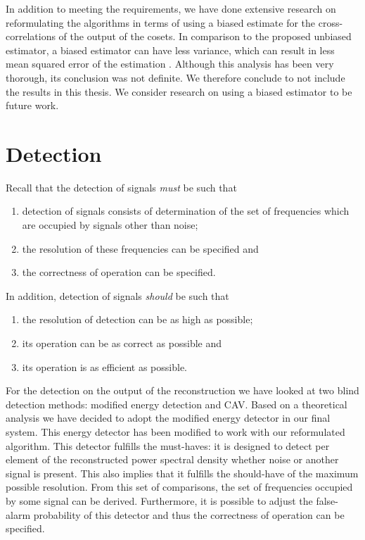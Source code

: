 \documentclass[a4paper, openany, oneside]{memoir}
\begin{document}
In addition to meeting the requirements, we have done extensive research on reformulating the algorithms in terms of using a biased estimate for the cross-correlations of the output of the cosets. In comparison to the proposed unbiased estimator, a biased estimator can have less variance, which can result in less mean squared error of the estimation \cite{hayes1996statistical}. Although this analysis has been very thorough, its conclusion was not definite. We therefore conclude to not include the results in this thesis. We consider research on using a biased estimator to be future work.

\section{Detection}
Recall that the detection of signals \emph{must} be such that
\begin{enumerate}
    \item detection of signals consists of determination of the set of frequencies which are occupied by signals other than noise;
    \item the resolution of these frequencies can be specified and
    \item the correctness of operation can be specified.
\end{enumerate}
In addition, detection of signals \emph{should} be such that
\begin{enumerate}
    \item the resolution of detection can be as high as possible;
    \item its operation can be as correct as possible and
    \item its operation is as efficient as possible.
\end{enumerate}

For the detection on the output of the reconstruction we have looked at two blind detection methods: modified energy detection and CAV. Based on  a theoretical analysis we have decided to adopt the modified energy detector in our final system. This energy detector has been modified to work with our reformulated algorithm. This detector fulfills the must-haves: it is designed to detect per element of the reconstructed power spectral
density whether noise or another signal is present. This also implies that it fulfills the should-have of the maximum possible resolution.  From this set of comparisons, the set of frequencies occupied by some signal can be derived. Furthermore, it is possible to adjust the false-alarm probability of this detector and thus the correctness of operation can be specified. 
\end{document}
